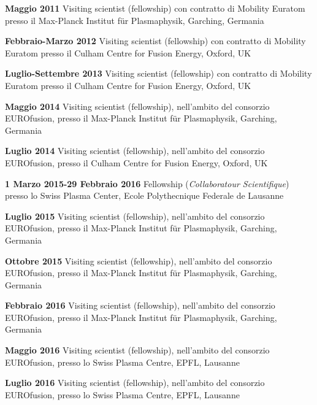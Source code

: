 \begin{enumerate}[label={[F\arabic*]}]
\item \textbf{Maggio 2011} Visiting scientist (fellowship) con
  contratto di Mobility Euratom presso il Max-Planck
Institut f\"ur Plasmaphysik, Garching, Germania

\item \textbf{Febbraio-Marzo 2012} Visiting scientist (fellowship) con
  contratto di Mobility Euratom presso il Culham Centre for
  Fusion Energy, Oxford, UK

\item \textbf{Luglio-Settembre 2013} Visiting scientist (fellowship) con
  contratto di Mobility Euratom presso il Culham Centre for
  Fusion Energy, Oxford, UK

\item \textbf{Maggio 2014} Visiting scientist (fellowship), nell'ambito del
  consorzio EUROfusion, presso il Max-Planck
Institut f\"ur Plasmaphysik, Garching, Germania

\item \textbf{Luglio 2014} Visiting scientist (fellowship), nell'ambito del
  consorzio EUROfusion, presso il Culham Centre for
  Fusion Energy, Oxford, UK

\item \textbf{1 Marzo 2015-29 Febbraio 2016} Fellowship
  (\emph{Collaboratour Scientifique}) presso lo Swiss Plasma Center,
  Ecole Polythecnique Federale de Lausanne
  
\item \textbf{Luglio 2015} Visiting scientist (fellowship), nell'ambito del
  consorzio EUROfusion, presso il Max-Planck
Institut f\"ur Plasmaphysik, Garching, Germania

\item \textbf{Ottobre 2015} Visiting scientist (fellowship), nell'ambito del
  consorzio EUROfusion, presso il Max-Planck
  Institut f\"ur Plasmaphysik, Garching, Germania

\item \textbf{Febbraio 2016} Visiting scientist (fellowship), nell'ambito del
  consorzio EUROfusion, presso il Max-Planck
  Institut f\"ur Plasmaphysik, Garching, Germania

\item \textbf{Maggio 2016} Visiting scientist (fellowship), nell'ambito del
  consorzio EUROfusion, presso lo Swiss Plasma Centre, EPFL,
  Lausanne

\item \textbf{Luglio 2016} Visiting scientist (fellowship), nell'ambito del
  consorzio EUROfusion, presso lo Swiss Plasma Centre, EPFL,  Lausanne


\end{enumerate}

